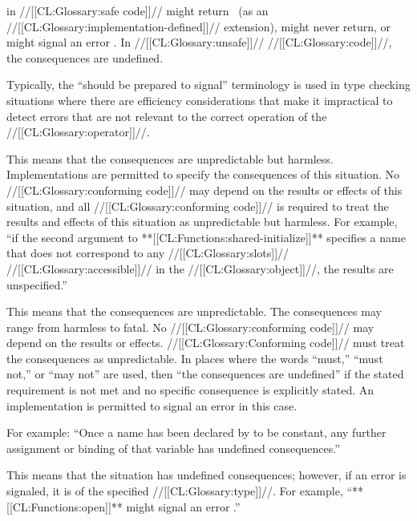 in //[[CL:Glossary:safe code]]//
   might return \nil\ (as an //[[CL:Glossary:implementation-defined]]// extension),
   might never return, or might signal an error . In //[[CL:Glossary:unsafe]]// //[[CL:Glossary:code]]//, the consequences are undefined.

Typically, the ``should be prepared to signal'' terminology is used in type checking situations where there are efficiency considerations that make it impractical to detect errors that are not relevant to the correct operation of the //[[CL:Glossary:operator]]//.


This means that the consequences are unpredictable but harmless. Implementations are permitted to specify the consequences of this situation. No //[[CL:Glossary:conforming code]]// may depend on the results or effects of this situation, and all //[[CL:Glossary:conforming code]]// is required to treat the results and effects of this situation as unpredictable but harmless. For example, ``if the second argument to **[[CL:Functions:shared-initialize]]** specifies a name that does not correspond to any //[[CL:Glossary:slots]]// //[[CL:Glossary:accessible]]// in the //[[CL:Glossary:object]]//, the results are unspecified.''


This means that the consequences are unpredictable. The consequences may range from harmless to fatal.  No //[[CL:Glossary:conforming code]]// may depend on the results or effects. //[[CL:Glossary:Conforming code]]// must treat the consequences as unpredictable.  In places where the words ``must,'' ``must not,'' or ``may not'' are used, then ``the consequences are undefined'' if the stated requirement is not met and no specific consequence is explicitly stated.  An implementation is permitted to signal an error in this case.

For example: ``Once a name has been declared by  to be constant, any further assignment or binding of that variable has undefined consequences.''

This means that the situation has undefined consequences; however, if an error is signaled, it is of the specified //[[CL:Glossary:type]]//. For example, ``**[[CL:Functions:open]]** might signal an error .''

